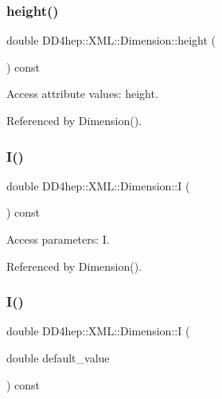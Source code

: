 \subsubsection{\texorpdfstring{height()}{height()}}
{\footnotesize\ttfamily double D\+D4hep\+::\+X\+M\+L\+::\+Dimension\+::height (\begin{DoxyParamCaption}{ }\end{DoxyParamCaption}) const}



Access attribute values\+: height. 



Referenced by Dimension().

\hypertarget{struct_d_d4hep_1_1_x_m_l_1_1_dimension_a2086e55444457dda316cc842ffdb33e0}{}\label{struct_d_d4hep_1_1_x_m_l_1_1_dimension_a2086e55444457dda316cc842ffdb33e0} 
\subsubsection{\texorpdfstring{I()}{I()}\hspace{0.1cm}{\footnotesize\ttfamily [1/2]}}
{\footnotesize\ttfamily double D\+D4hep\+::\+X\+M\+L\+::\+Dimension\+::I (\begin{DoxyParamCaption}{ }\end{DoxyParamCaption}) const}



Access parameters\+: I. 



Referenced by Dimension().

\hypertarget{struct_d_d4hep_1_1_x_m_l_1_1_dimension_a932e2af0c0e9f3853816a2972e06c909}{}\label{struct_d_d4hep_1_1_x_m_l_1_1_dimension_a932e2af0c0e9f3853816a2972e06c909} 
\subsubsection{\texorpdfstring{I()}{I()}\hspace{0.1cm}{\footnotesize\ttfamily [2/2]}}
{\footnotesize\ttfamily double D\+D4hep\+::\+X\+M\+L\+::\+Dimension\+::I (\begin{DoxyParamCaption}\item[{double}]{default\+\_\+value }\end{DoxyParamCaption}) const}



